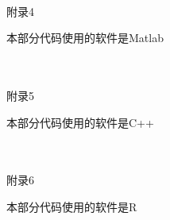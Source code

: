 \documentclass{ctexart}
\begin{document}
\begin{flushleft}
~\\

附录4

本部分代码使用的软件是Matlab

~\\



~\\

附录5

本部分代码使用的软件是C++

~\\



~\\

附录6

本部分代码使用的软件是R

~\\



~\\


\end{flushleft}
\end{document}
